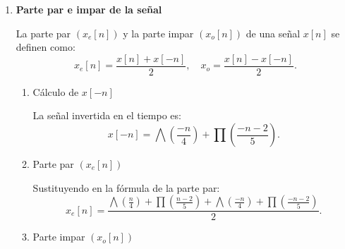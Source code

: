 \begin{enumerate}[label=\color{red}\textbf{\arabic*)}]
    \begin{enumerate}[label=\textbf{\arabic*)}]
        \item \textbf{Parte par e impar de la señal}

            La parte par $(x_e[n])$ y la parte impar  $(x_o[n])$ de una señal  $x[n]$ se definen como:  \[
                x_e[n]=\dfrac{x[n]+x[-n]}{2},\quad x_o=\dfrac{x[n]-x[-n]}{2}.
            \] 
            \begin{enumerate}[label=\alph*)]
                \item Cálculo de $x[-n]$

                    La señal invertida en el tiempo es:  \[
                        x[-n]=\bigwedge\left( \dfrac{-n}{4} \right) +\prod\left( \dfrac{-n-2}{5} \right) .
                    \] 
                \item Parte par $(x_e[n])$
 
                    Sustituyendo en la fórmula de la parte par: \[
                        x_e[n]=\dfrac{\bigwedge\left( \frac{n}{4}  \right) +\prod\left( \frac{n-2}{5}  \right) +\bigwedge\left( \frac{-n}{4}  \right) +\prod\left( \frac{-n-2}{5}  \right) }{2}.
                    \] 
                \item Parte impar $(x_o[n])$


\end{enumerate}
\end{enumerate}
\end{enumerate}
